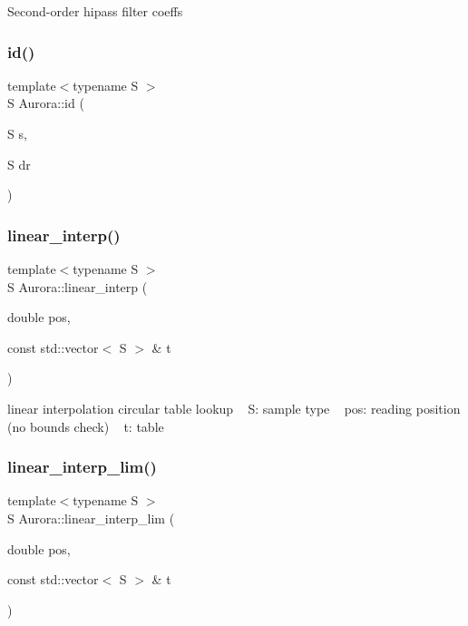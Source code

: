 Second-\/order hipass filter coeffs \mbox{\label{namespace_aurora_aca47d4c2fcfc307c85418fe7a0b1e98e}} 
\subsubsection{\texorpdfstring{id()}{id()}}
{\footnotesize\ttfamily template$<$typename S $>$ \\
S Aurora\+::id (\begin{DoxyParamCaption}\item[{S}]{s,  }\item[{S}]{dr }\end{DoxyParamCaption})\hspace{0.3cm}{\ttfamily [inline]}}

\mbox{\label{namespace_aurora_acdc5f35b9cbf54f7fc84a423d76bd488}} 
\subsubsection{\texorpdfstring{linear\+\_\+interp()}{linear\_interp()}}
{\footnotesize\ttfamily template$<$typename S $>$ \\
S Aurora\+::linear\+\_\+interp (\begin{DoxyParamCaption}\item[{double}]{pos,  }\item[{const std\+::vector$<$ S $>$ \&}]{t }\end{DoxyParamCaption})\hspace{0.3cm}{\ttfamily [inline]}}

linear interpolation circular table lookup ~\newline
S\+: sample type ~\newline
pos\+: reading position (no bounds check) ~\newline
t\+: table \mbox{\label{namespace_aurora_af38f1e4b1a40dab35331f0a2be969091}} 
\subsubsection{\texorpdfstring{linear\+\_\+interp\+\_\+lim()}{linear\_interp\_lim()}}
{\footnotesize\ttfamily template$<$typename S $>$ \\
S Aurora\+::linear\+\_\+interp\+\_\+lim (\begin{DoxyParamCaption}\item[{double}]{pos,  }\item[{const std\+::vector$<$ S $>$ \&}]{t }\end{DoxyParamCaption})\hspace{0.3cm}{\ttfamily [inline]}}

